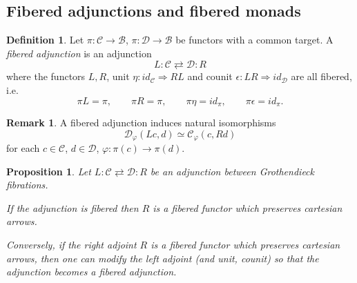 \documentclass[a4paper,10pt
,draft
]{article}%
\numberwithin{equation}{section}
\numberwithin{figure}{section}
\newtheorem{proposition}[equation]{Proposition}%
\theoremstyle{definition} %
\newtheorem{definition}[equation]{Definition}%
\newtheorem{remark}[equation]{Remark}%
\newcommand{\1}{\ensuremath{\mathbbm 1}}%
\begin{document}
\subsection{Fibered adjunctions and fibered monads}
\label{FIBCAT_SEC}



\begin{definition}\label{FIBADJ DEF}
Let 
$\pi \colon \mathcal{C} \to \mathcal{B}$,
$\pi \colon \mathcal{D} \to \mathcal{B}$
be functors with a common target.
A \emph{fibered adjunction} is an adjunction
\[
L \colon \mathcal{C} \rightleftarrows \mathcal{D} \colon R
\]
where the functors $L,R$, 
unit $\eta \colon id_{\mathcal{C}} \Rightarrow RL$ and 
counit $\epsilon \colon LR \Rightarrow id_{\mathcal{D}}$
are all fibered, i.e.
\[
\pi L=\pi, \qquad
\pi R = \pi, \qquad
\pi \eta = id_{\pi}, \qquad 
\pi\epsilon = id_{\pi}.
\]
\end{definition}



\begin{remark}
A fibered adjunction induces natural isomorphisms
\[
\mathcal{D}_{\varphi}\left(Lc,d\right)
\simeq
\mathcal{C}_{\varphi}\left(c,Rd\right)
\]
for each $c\in \mathcal{C}$, $d \in \mathcal{D}$, 
$\varphi \colon \pi(c)\to \pi(d)$. 
\end{remark}



\begin{proposition}\label{FIBADJCAR PROP}
Let $L \colon \mathcal{C} \rightleftarrows \mathcal{D} \colon R$
be an adjunction between Grothendieck fibrations.

If the adjunction is fibered then 
$R$ is 
a fibered functor which preserves cartesian arrows.

Conversely, if the right adjoint $R$ is 
a fibered functor which preserves cartesian arrows, 
then one can modify the left adjoint (and unit, counit)
so that the adjunction becomes a fibered adjunction.
\end{proposition}
\end{document}
